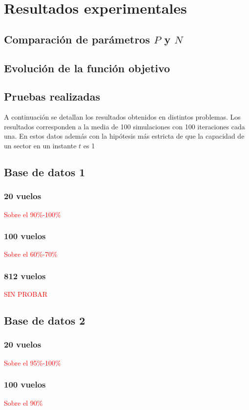 \chapter{Resultados experimentales}

\section{Comparación de parámetros $P$ y $N$}
\section{Evolución de la función objetivo}
\section{Pruebas realizadas}



A continuación se detallan los resultados obtenidos en distintos problemas. Los resultados corresponden a la media de 100 simulaciones con 100 iteraciones cada una. En estos datos además con la hipótesis más estricta de que la capacidad de un sector en un instante $t$ es 1

\section{Base de datos 1}
\subsection{20 vuelos}
\textcolor{red}{Sobre el 90\%-100\%}
\subsection{100 vuelos}
\textcolor{red}{Sobre el 60\%-70\%}
\subsection{812 vuelos}
\textcolor{red}{SIN PROBAR}

\section{Base de datos 2}
\subsection{20 vuelos}
\textcolor{red}{Sobre el 95\%-100\%}
\subsection{100 vuelos}
\textcolor{red}{Sobre el 90\%}
